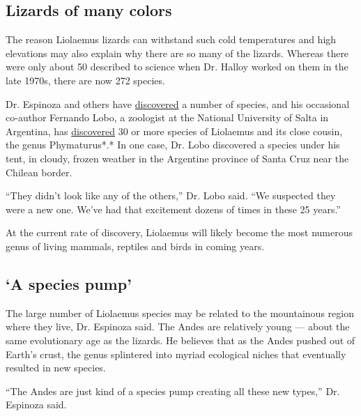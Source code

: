 \hypertarget{lizards-of-many-colors}{%
\subsection{Lizards of many colors}\label{lizards-of-many-colors}}

The reason Liolaemus lizards can withstand such cold temperatures and
high elevations may also explain why there are so many of the lizards.
Whereas there were only about 50 described to science when Dr. Halloy
worked on them in the late 1970s, there are now 272 species.

Dr. Espinoza and others have
\href{https://bioone.org/journals/Herpetologica/volume-64/issue-4/08-022R1.1/Two-New-Species-of-span-classgenus-speciesLiolaemus-span-Iguania/10.1655/08-022R1.1.short}{discovered}
a number of species, and his occasional co-author Fernando Lobo, a
zoologist at the National University of Salta in Argentina, has
\href{https://bioone.org/journals/Journal-of-Herpetology/volume-44/issue-2/08-334.1/Two-New-Species-of-Lizards-of-the-Liolaemus-montanus-Group/10.1670/08-334.1.short}{discovered}
30 or more species of Liolaemus and its close cousin, the genus
Phymaturus*.* In one case, Dr. Lobo discovered a species under his tent,
in cloudy, frozen weather in the Argentine province of Santa Cruz near
the Chilean border.

``They didn't look like any of the others,'' Dr. Lobo said. ``We
suspected they were a new one. We've had that excitement dozens of times
in these 25 years.''

At the current rate of discovery, Liolaemus will likely become the most
numerous genus of living mammals, reptiles and birds in coming years.

\hypertarget{a-species-pump}{%
\subsection{`A species pump'}\label{a-species-pump}}

The large number of Liolaemus species may be related to the mountainous
region where they live, Dr. Espinoza said. The Andes are relatively
young --- about the same evolutionary age as the lizards. He believes
that as the Andes pushed out of Earth's crust, the genus splintered into
myriad ecological niches that eventually resulted in new species.

``The Andes are just kind of a species pump creating all these new
types,'' Dr. Espinoza said.

